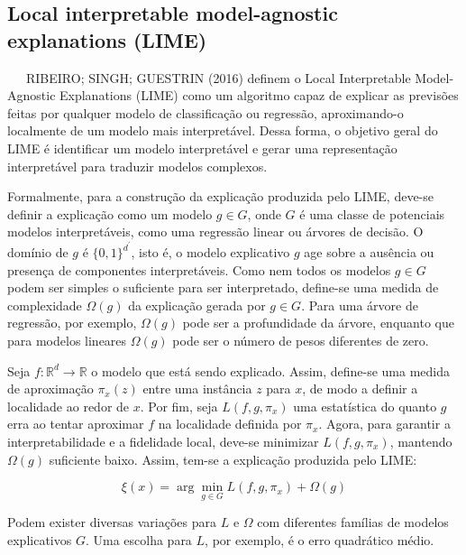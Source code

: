 \documentclass[
  12pt,
  a4paper,
]{scrreprt}
\begin{document}
\subsection{Local interpretable model-agnostic explanations
(LIME)}\label{local-interpretable-model-agnostic-explanations-lime}

~~~RIBEIRO; SINGH; GUESTRIN (2016) definem o Local Interpretable
Model-Agnostic Explanations (LIME) como um algoritmo capaz de explicar
as previsões feitas por qualquer modelo de classificação ou regressão,
aproximando-o localmente de um modelo mais interpretável. Dessa forma, o
objetivo geral do LIME é identificar um modelo interpretável e gerar uma
representação interpretável para traduzir modelos complexos.

\vspace{12pt}

Formalmente, para a construção da explicação produzida pelo LIME,
deve-se definir a explicação como um modelo \(g \in G\), onde \(G\) é
uma classe de potenciais modelos interpretáveis, como uma regressão
linear ou árvores de decisão. O domínio de \(g\) é \(\{0, 1\}^{d^{'}}\),
isto é, o modelo explicativo \(g\) age sobre a ausência ou presença de
componentes interpretáveis. Como nem todos os modelos \(g \in G\) podem
ser simples o suficiente para ser interpretado, define-se uma medida de
complexidade \(\Omega\left(g\right)\) da explicação gerada por
\(g \in G\). Para uma árvore de regressão, por exemplo,
\(\Omega\left(g\right)\) pode ser a profundidade da árvore, enquanto que
para modelos lineares \(\Omega\left(g\right)\) pode ser o número de
pesos diferentes de zero.

\vspace{12pt}

Seja \(f: \mathbb{R}^d \rightarrow \mathbb{R}\) o modelo que está sendo
explicado. Assim, define-se uma medida de aproximação
\(\pi_x\left(z\right)\) entre uma instância \(z\) para \(x\), de modo a
definir a localidade ao redor de \(x\). Por fim, seja
\(L\left(f, g, \pi_x\right)\) uma estatística do quanto \(g\) erra ao
tentar aproximar \(f\) na localidade definida por \(\pi_x\). Agora, para
garantir a interpretabilidade e a fidelidade local, deve-se minimizar
\(L\left(f, g, \pi_x\right)\), mantendo \(\Omega\left(g\right)\)
suficiente baixo. Assim, tem-se a explicação produzida pelo LIME:

\[
\xi\left(x\right) = \arg \min_{g \in G} L\left(f, g, \pi_x\right) + \Omega\left(g\right)
\]

Podem exister diversas variações para \(L\) e \(\Omega\) com diferentes
famílias de modelos explicativos \(G\). Uma escolha para \(L\), por
exemplo, é o erro quadrático médio.
\end{document}
